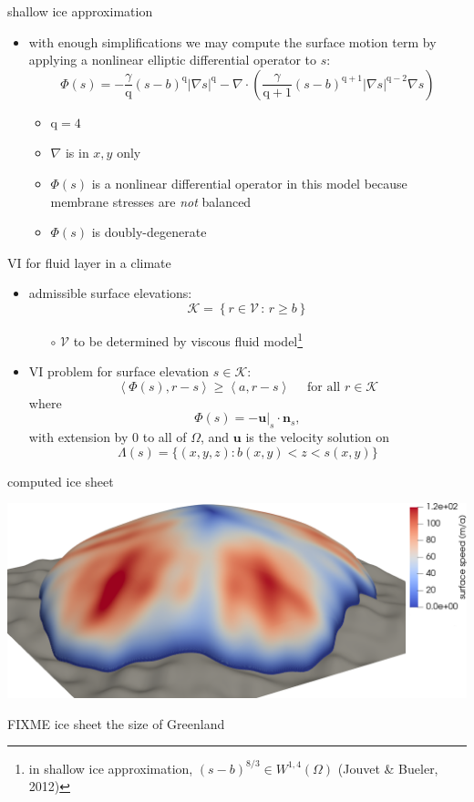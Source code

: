 \documentclass[svgnames,
               hyperref={colorlinks,citecolor=DeepPink4,linkcolor=FireBrick,urlcolor=Maroon},
               usepdftitle=false]  %
               {beamer}
\newcommand{\grad}{\nabla}
\newcommand{\bn}{\mathbf{n}}
\newcommand{\bu}{\mathbf{u}}
\newcommand{\ip}[2]{\left<#1,#2\right>}
\newcommand{\qq}{{\text{q}}}
\begin{document}
\begin{frame}{shallow ice approximation}

\begin{itemize}
\item with enough simplifications we may compute the surface motion term by applying a nonlinear elliptic differential operator to $s$:
    $$\Phi(s) = - \frac{\gamma}{\qq} (s-b)^{\qq} |\grad s|^{\qq} - \grad \cdot\left(\frac{\gamma}{\qq+1} (s-b)^{\qq+1} |\grad s|^{\qq-2} \grad s\right)$$
    \begin{itemize}
    \item $\qq = 4$
    \item $\grad$ is in $x,y$ only
    \item $\Phi(s)$ is a nonlinear \alert{differential operator} in this model because membrane stresses are \emph{not} balanced
    \item $\Phi(s)$ is doubly-degenerate
    \end{itemize}
\end{itemize}
\end{frame}


\begin{frame}{VI for fluid layer in a climate}

\begin{itemize}
\item admissible surface elevations:
    $$\mathcal{K} = \left\{r \in \mathcal{V} \,:\, r \ge b\right\}$$

    \begin{itemize}
    \item[$\circ$] $\mathcal{V}$ to be determined by viscous fluid model\footnote{in shallow ice approximation, $(s-b)^{8/3} \in W^{1,4}(\Omega)$ (Jouvet \& Bueler, 2012)}
    \end{itemize}
\item VI problem for surface elevation $s\in\mathcal{K}$:
	$$\ip{\Phi(s)}{r-s} \ge \ip{a}{r-s} \quad \text{ for all } r \in \mathcal{K}$$
where
    $$\Phi(s)=- \bu|_s \cdot \bn_s,$$
with extension by 0 to all of $\Omega$, and $\bu$ is the velocity solution on
    $$\Lambda(s) = \{(x,y,z) : b(x,y) < z < s(x,y)\}$$
\end{itemize}
\end{frame}


\begin{frame}{computed ice sheet}

\centering
\includegraphics[width=\textwidth]{../paper/fixfigs/sialev8scene.png}

FIXME ice sheet the size of Greenland
\end{frame}
\end{document}
